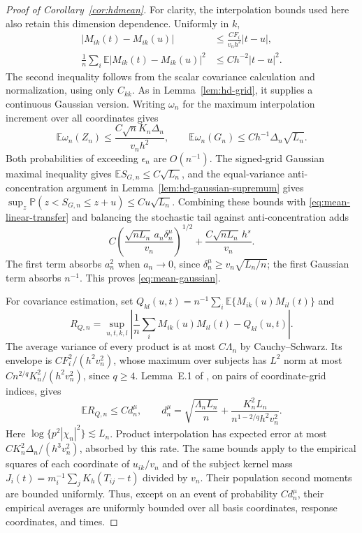 \documentclass[10pt]{book}
\newcommand{\expect}{\mathbb{E}}
\newcommand{\prob}{\mathbb{P}}
\numberwithin{equation}{section}
\begin{document}
\begin{proof}[Proof of Corollary~\ref{cor:hdmean}]
For clarity, the interpolation bounds used here also retain this
dimension dependence. Uniformly in $k$,
\[
\begin{aligned}
|M_{ik}(t)-M_{ik}(u)|
&\le \frac{CF_i}{v_nh^2}|t-u|,\\
\frac1n\sum_i\expect|M_{ik}(t)-M_{ik}(u)|^2
&\le Ch^{-2}|t-u|^2 .
\end{aligned}
\]
The second inequality follows from the scalar covariance calculation
and normalization, using only $C_{kk}$. As in
Lemma~\ref{lem:hd-grid}, it supplies a continuous Gaussian version.
Writing $\omega_n$ for the maximum interpolation increment over all
coordinates gives
\[
\expect\omega_n(Z_n)\le
\frac{C\sqrt n K_n\Delta_n}{v_nh^2},\qquad
\expect\omega_n(G_n)\le Ch^{-1}\Delta_n\sqrt{L_n}.
\]
Both probabilities of exceeding $\epsilon_n$ are $O(n^{-1})$.
The signed-grid Gaussian maximal inequality gives
$\expect S_{G,n}\le C\sqrt{L_n}$, and the equal-variance
anti-concentration argument in Lemma~\ref{lem:hd-gaussian-supremum}
gives
$\sup_z\prob(z<S_{G,n}\le z+u)\le Cu\sqrt{L_n}$.
Combining these bounds with \eqref{eq:mean-linear-transfer} and
balancing the stochastic tail against anti-concentration adds
\[
C\left(\frac{\sqrt{nL_n}\,a_n\delta_n^\mu}{v_n}\right)^{1/2}
+\frac{C\sqrt{nL_n}\,h^s}{v_n}.
\]
The first term absorbs $a_n^2$ when $a_n\to0$, since
$\delta_n^\mu\ge v_n\sqrt{L_n/n}$; the first Gaussian term absorbs
$n^{-1}$. This proves \eqref{eq:mean-gaussian}.

For covariance estimation, set
$Q_{kl}(u,t)=n^{-1}\sum_i\expect\{M_{ik}(u)M_{il}(t)\}$ and
\[
R_{Q,n}=\sup_{u,t,k,l}\left|
\frac1n\sum_i M_{ik}(u)M_{il}(t)-Q_{kl}(u,t)\right|.
\]
The average variance of every product is at most $C\Lambda_n$ by
Cauchy--Schwarz. Its envelope is $CF_i^2/(h^2v_n^2)$, whose maximum
over subjects has $L^2$ norm at most
$Cn^{2/q}K_n^2/(h^2v_n^2)$, since $q\ge4$.
Lemma~E.1 of \citet{chernozhukov_central_2017}, on pairs of
coordinate-grid indices, gives
\[
\expect R_{Q,n}\le Cd_n^\mu,\qquad
d_n^\mu=\sqrt{\frac{\Lambda_nL_n}{n}}+
\frac{K_n^2L_n}{n^{1-2/q}h^2v_n^2}.
\]
Here $\log\{p^2|\chi_n|^2\}\lesssim L_n$.
Product interpolation has expected error at most
$CK_n^2\Delta_n/(h^3v_n^2)$, absorbed by this rate.
The same bounds apply to the empirical squares of each coordinate
of $u_{ik}/v_n$ and of the subject kernel mass
$J_i(t)=m_i^{-1}\sum_j K_h(T_{ij}-t)$ divided by $v_n$.
Their population second moments are bounded uniformly. Thus, except
on an event of probability $Cd_n^\mu$, their empirical averages are
uniformly bounded over all basis coordinates, response coordinates,
and times.


\end{proof}
\end{document}
